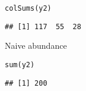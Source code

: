 \documentclass[color=usenames,dvipsnames]{beamer}\usepackage[]{graphicx}\usepackage[]{color}
\makeatletter
\newcommand{\hlstd}[1]{\textcolor[rgb]{0,0,0}{#1}}%
\newcommand{\hlkwd}[1]{\textcolor[rgb]{0.004,0.004,0.506}{#1}}%
\newenvironment{kframe}{%
 \def\at@end@of@kframe{}%
 \ifinner\ifhmode%
  \def\at@end@of@kframe{\end{minipage}}%
  \begin{minipage}{\columnwidth}%
 \fi\fi%
 \def\FrameCommand##1{\hskip\@totalleftmargin \hskip-\fboxsep
 \colorbox{shadecolor}{##1}\hskip-\fboxsep
     \hskip-\linewidth \hskip-\@totalleftmargin \hskip\columnwidth}%
 \MakeFramed {\advance\hsize-\width
   \@totalleftmargin\z@ \linewidth\hsize
   \@setminipage}}%
 {\par\unskip\endMakeFramed%
 \at@end@of@kframe}
\newenvironment{knitrout}{}{} %
\makeatother
\begin{document}
\begin{frame}[fragile]
\begin{columns}
\begin{column}{0.6\textwidth}
\begin{knitrout}\scriptsize
{}\color{fgcolor}\begin{kframe}
\begin{alltt}
\hlkwd{colSums}\hlstd{(y2)}
\end{alltt}
\begin{verbatim}
## [1] 117  55  28
\end{verbatim}
\end{kframe}
\end{knitrout}
  \pause
  \vfill
  Naive abundance
  \vspace{-6pt}
\begin{knitrout}\scriptsize
{}\color{fgcolor}\begin{kframe}
\begin{alltt}
\hlkwd{sum}\hlstd{(y2)}
\end{alltt}
\begin{verbatim}
## [1] 200
\end{verbatim}
\end{kframe}
\end{knitrout}

  \end{column}
  \end{columns}
\end{frame}












\end{document}
